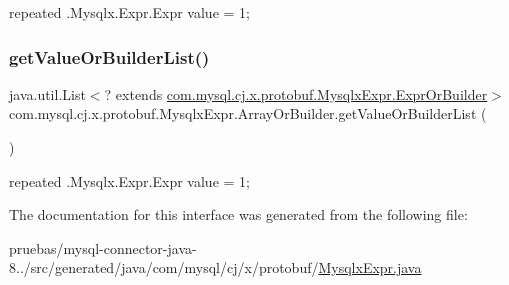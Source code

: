 {\ttfamily repeated .Mysqlx.\+Expr.\+Expr value = 1;} \mbox{\label{interfacecom_1_1mysql_1_1cj_1_1x_1_1protobuf_1_1_mysqlx_expr_1_1_array_or_builder_a5848db086fca6625e7bab2d9be6b1ea8}} 
\subsubsection{\texorpdfstring{get\+Value\+Or\+Builder\+List()}{getValueOrBuilderList()}}
{\footnotesize\ttfamily java.\+util.\+List$<$? extends \mbox{\hyperlink{interfacecom_1_1mysql_1_1cj_1_1x_1_1protobuf_1_1_mysqlx_expr_1_1_expr_or_builder}{com.\+mysql.\+cj.\+x.\+protobuf.\+Mysqlx\+Expr.\+Expr\+Or\+Builder}}$>$ com.\+mysql.\+cj.\+x.\+protobuf.\+Mysqlx\+Expr.\+Array\+Or\+Builder.\+get\+Value\+Or\+Builder\+List (\begin{DoxyParamCaption}{ }\end{DoxyParamCaption})}

{\ttfamily repeated .Mysqlx.\+Expr.\+Expr value = 1;} 

The documentation for this interface was generated from the following file\+:\begin{DoxyCompactItemize}
\item 
pruebas/mysql-\/connector-\/java-\/8../src/generated/java/com/mysql/cj/x/protobuf/\mbox{\hyperlink{_mysqlx_expr_8java}{Mysqlx\+Expr.\+java}}\end{DoxyCompactItemize}
